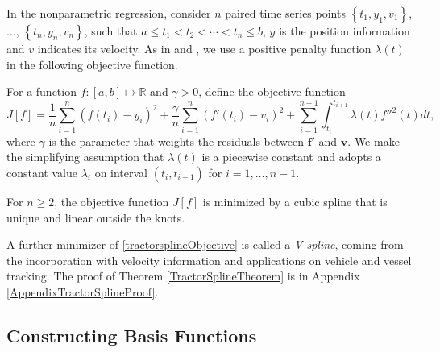 In the nonparametric regression, consider $n$ paired time series points $\left\lbrace t_1,y_1,v_1\right\rbrace$, $\ldots$, $\left\lbrace t_n,y_n,v_n\right\rbrace$, such that $a \leq t_1<t_2< \cdots < t_n \leq b$, $y$ is the position information and $v$ indicates its velocity. As in \citep{silverman1985some} and \citep{donoho1995wavelet}, we use a positive penalty function $\lambda(t)$ in the following objective function. 

For a function $f:[a,b]\mapsto \mathbb{R}$ and $\gamma>0$, define the objective function 
\begin{equation}\label{tractorsplineObjective}
J[f]= \frac{1}{n} \sum_{i=1}^{n} \left( f(t_i)-y_i \right)^2 + \frac{\gamma}{n} \sum_{i=1}^{n} \left( f'(t_i)-v_i \right)^2 +\sum_{i=1}^{n-1} \int_{t_i}^{t_{i+1}}\lambda(t)  f''^2(t)dt,
\end{equation}
where $\gamma$ is the parameter that weights the residuals between $\mathbf{f}'$ and $\mathbf{v}$. We make the simplifying assumption that $\lambda(t)$ is a piecewise constant and adopts a constant value $\lambda_i$ on interval $(t_i,t_{i+1})$ for $i=1,\ldots, n-1$. 

\begin{theorem}\label{TractorSplineTheorem}
For $n\geq2$, the objective function $J[f]$ is minimized by a cubic spline that is unique and linear outside the knots.
\end{theorem}
A further minimizer of \eqref{tractorsplineObjective} is called a \textit{V-spline}, coming from the incorporation with velocity information and applications on vehicle and vessel tracking. The proof of Theorem \ref{TractorSplineTheorem} is in Appendix \ref{AppendixTractorSplineProof}. 



\subsection{Constructing Basis Functions}

